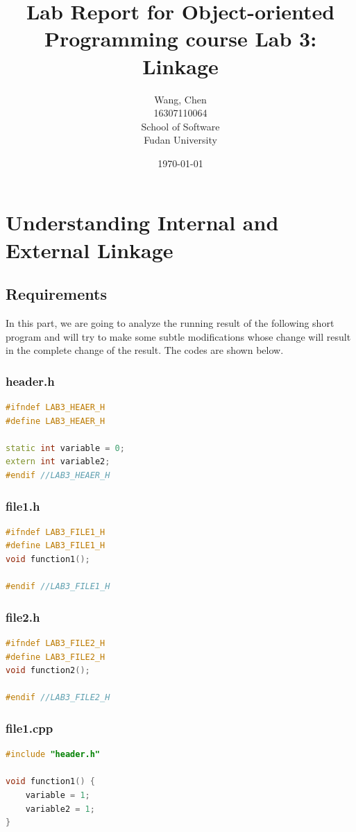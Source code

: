 \documentclass[a4paper]{report}
\title{Lab Report for Object-oriented Programming course \newline
 Lab 3: Linkage}
\author{Wang, Chen \\ 16307110064 \\ School of Software\\ Fudan University}
\date{\today}
\begin{document}
\maketitle

\tableofcontents

\chapter{Understanding Internal and External Linkage}
\section{Requirements}
In this part, we are going to analyze the running result of the following short program and will try to make some subtle modifications whose change will result in the complete change of the result.
The codes are shown below.

\subsection{header.h}
\begin{lstlisting}[language=C++]
#ifndef LAB3_HEAER_H
#define LAB3_HEAER_H

static int variable = 0;
extern int variable2;
#endif //LAB3_HEAER_H

\end{lstlisting}


\subsection{file1.h}
\begin{lstlisting}[language=C++]
#ifndef LAB3_FILE1_H
#define LAB3_FILE1_H
void function1();

#endif //LAB3_FILE1_H

\end{lstlisting}

\subsection{file2.h}
\begin{lstlisting}[language=C++]
#ifndef LAB3_FILE2_H
#define LAB3_FILE2_H
void function2();

#endif //LAB3_FILE2_H

\end{lstlisting}


\subsection{file1.cpp}
\begin{lstlisting}[language=C++]
#include "header.h"

void function1() {
    variable = 1;
    variable2 = 1;
}
\end{lstlisting}
\end{document}
